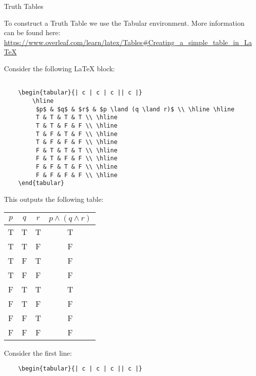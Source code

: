 \documentclass{article}
\begin{document}
\begin{section}{Truth Tables}

To construct a Truth Table we use the Tabular environment. More information can be found here: \url{https://www.overleaf.com/learn/latex/Tables#Creating_a_simple_table_in_LaTeX} \medskip

\noindent Consider the following \LaTeX{} block:

\begin{verbatim}

    \begin{tabular}{| c | c | c || c |}
        \hline
         $p$ & $q$ & $r$ & $p \land (q \land r)$ \\ \hline \hline
         T & T & T & T \\ \hline
         T & T & F & F \\ \hline
         T & F & T & F \\ \hline
         T & F & F & F \\ \hline
         F & T & T & T \\ \hline
         F & T & F & F \\ \hline
         F & F & T & F \\ \hline
         F & F & F & F \\ \hline
    \end{tabular}
\end{verbatim}

\noindent This outputs the following table: \medskip

\begin{tabular}{| c | c | c || c |}
    \hline
     $p$ & $q$ & $r$ & $p \land (q \land r)$ \\ \hline \hline
     T & T & T & T \\ \hline
     T & T & F & F \\ \hline
     T & F & T & F \\ \hline
     T & F & F & F \\ \hline
     F & T & T & T \\ \hline
     F & T & F & F \\ \hline
     F & F & T & F \\ \hline
     F & F & F & F \\ \hline
\end{tabular} \medskip

\noindent Consider the first line:
\begin{verbatim}
    \begin{tabular}{| c | c | c || c |}
\end{verbatim}


\end{section}
\end{document}
